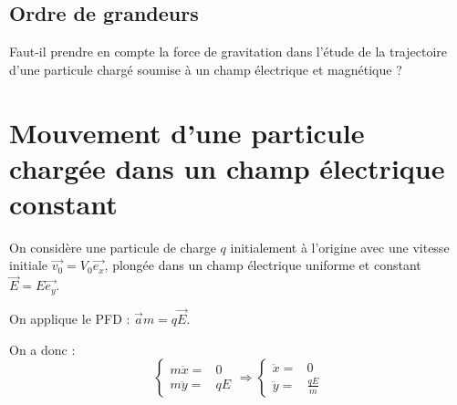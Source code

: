 \documentclass[french]{yLectureNote}
\renewcommand{\vec}{\overrightarrow}
\begin{document}
\subsection{Ordre de grandeurs}
Faut-il prendre en compte la force de gravitation dans l'étude de la trajectoire d'une particule chargé soumise à un champ électrique et magnétique ?

\section{Mouvement d'une particule chargée dans un champ électrique constant}
On considère une particule de charge $q$ initialement à l'origine avec une vitesse initiale $\vec{v_0} = V_0\vec{e_x}$, plongée dans un champ électrique uniforme et constant $\vec{E} = E\vec{e_y}$.


On applique le PFD : $\vec{a}m = q\vec{E}$.

On a donc :
\[
 \left\{\begin{matrix}
 m\ddot{x} =& 0 \\
 m\ddot{y} =& qE
\end{matrix}\right.
\Rightarrow
 \left\{\begin{matrix}
 \ddot{x} =& 0\\
 \ddot{y} =& \frac{qE}{m}
\end{matrix}\right.
\]
\end{document}
